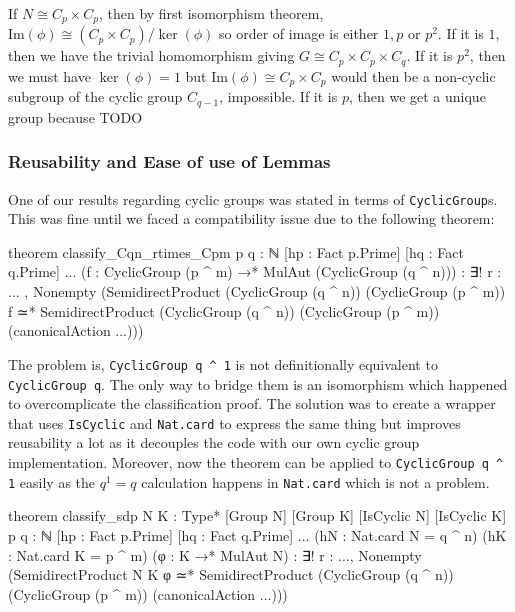 If $N \cong C_p \times C_p$, then by first isomorphism theorem, $\text{Im}(\phi) \cong (C_p \times C_p) / \ker(\phi)$ so order of image is either $1, p$ or $p^2$. If it is $1$, then we have the trivial homomorphism giving $G \cong C_p \times C_p \times C_{q}$. If it is $p^2$, then we must have $\ker(\phi) = 1$ but $\text{Im}(\phi) \cong C_p \times C_p$ would then be a non-cyclic subgroup of the cyclic group $C_{q-1}$, impossible. If it is $p$, then we get a unique group because TODO

\subsubsection{Reusability and Ease of use of Lemmas}

One of our results regarding cyclic groups was stated in terms of \texttt{CyclicGroup}s. This was fine until we faced a compatibility issue due to the following theorem:

\begin{leancode}
    theorem classify_Cqn_rtimes_Cpm
    {p q : ℕ} [hp : Fact p.Prime] [hq : Fact q.Prime] ...
    (f : CyclicGroup (p ^ m) →* MulAut (CyclicGroup (q ^ n))) :
    ∃! r : ... , Nonempty (SemidirectProduct (CyclicGroup (q ^ n)) (CyclicGroup (p ^ m)) f ≃*
               SemidirectProduct (CyclicGroup (q ^ n)) (CyclicGroup (p ^ m))
                 (canonicalAction ...)))
\end{leancode}

The problem is, \texttt{CyclicGroup q ^ 1} is not definitionally equivalent to \texttt{CyclicGroup q}. The only way to bridge them is an isomorphism which happened to overcomplicate the classification proof. The solution was to create a wrapper that uses \texttt{IsCyclic} and \texttt{Nat.card} to express the same thing but improves reusability a lot as it decouples the code with our own cyclic group implementation. Moreover, now the theorem can be applied to \texttt{CyclicGroup q ^ 1} easily as the $q^1 = q$ calculation happens in \texttt{Nat.card} which is not a problem.

\begin{leancode}
    theorem classify_sdp
    {N K : Type*} [Group N] [Group K] [IsCyclic N] [IsCyclic K]
    {p q : ℕ} [hp : Fact p.Prime] [hq : Fact q.Prime] ...
    (hN : Nat.card N = q ^ n) (hK : Nat.card K = p ^ m)
    (φ : K →* MulAut N) :
    ∃! r : ...,
      Nonempty (SemidirectProduct N K φ ≃*
               SemidirectProduct (CyclicGroup (q ^ n)) (CyclicGroup (p ^ m))
                 (canonicalAction ...)))
\end{leancode}

